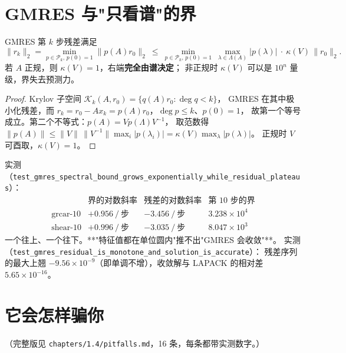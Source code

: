 \section{GMRES 与"只看谱"的界}

\begin{theorem}
\label{thm:gmres}
GMRES 第 $k$ 步残差满足
\[
  \|r_k\|_2=\min_{p\in\mathcal{P}_k,\,p(0)=1}\|p(A)r_0\|_2
  \ \le\ \min_{p\in\mathcal{P}_k,\,p(0)=1}\ \max_{\lambda\in\Lambda(A)}|p(\lambda)|\ \cdot\ \kappa(V)\,\|r_0\|_2 .
\]
若 $A$ 正规，则 $\kappa(V)=1$，右端\textbf{完全由谱决定}；
非正规时 $\kappa(V)$ 可以是 $10^{n}$ 量级，界失去预测力。
\end{theorem}

\begin{proof}
Krylov 子空间 $\mathcal{K}_k(A,r_0)=\{q(A)r_0:\deg q<k\}$，
GMRES 在其中极小化残差，而 $r_k=r_0-Ax_k=p(A)r_0$，$\deg p\le k$、$p(0)=1$，
故第一个等号成立。第二个不等式：$p(A)=Vp(\Lambda)V^{-1}$，
取范数得 $\|p(A)\|\le\|V\|\,\|V^{-1}\|\max_i|p(\lambda_i)|=\kappa(V)\max_\lambda|p(\lambda)|$。
正规时 $V$ 可酉取，$\kappa(V)=1$。
\end{proof}

实测（\texttt{test\_gmres\_spectral\_bound\_grows\_exponentially\_while\_residual\_plateaus}）：
\[
\begin{array}{c|ccc}
 & \text{界的对数斜率} & \text{残差的对数斜率} & \text{第 10 步的界}\\\hline
\text{grcar-10} & +0.956\ /\ \text{步} & -3.456\ /\ \text{步} & 3.238\times10^{4}\\
\text{shear-10} & +0.996\ /\ \text{步} & -3.035\ /\ \text{步} & 8.047\times10^{3}
\end{array}
\]
一个往上、一个往下。**"特征值都在单位圆内"推不出"GMRES 会收敛"**。
实测（\texttt{test\_gmres\_residual\_is\_monotone\_and\_solution\_is\_accurate}）：
残差序列的最大上翘 $-9.56\times10^{-9}$（即单调不增），收敛解与 LAPACK 的相对差
$5.65\times10^{-16}$。

\section{它会怎样骗你}

（完整版见 \texttt{chapters/1.4/pitfalls.md}，16 条，每条都带实测数字。）

